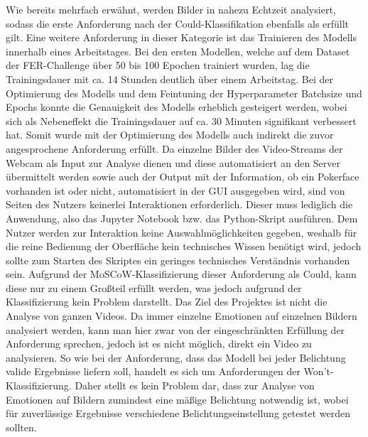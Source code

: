 \documentclass[12pt, a4paper]{report}
\begin{document}
Wie bereits mehrfach erwähnt, werden Bilder in nahezu Echtzeit analysiert, sodass die erste Anforderung nach der Could-Klassifikation ebenfalls als erfüllt gilt. Eine weitere Anforderung in dieser Kategorie ist das Trainieren des Modells innerhalb eines Arbeitstages. Bei den ersten Modellen, welche auf dem Dataset der FER-Challenge über 50 bis 100 Epochen trainiert wurden, lag die Trainingsdauer mit ca. 14 Stunden deutlich über einem Arbeitstag. Bei der Optimierung des Modells und dem Feintuning der Hyperparameter Batchsize und Epochs konnte die Genauigkeit des Modells erheblich gesteigert werden, wobei sich als Nebeneffekt die Trainingsdauer auf ca. 30 Minuten signifikant verbessert hat. Somit wurde mit der Optimierung des Modells auch indirekt die zuvor angesprochene Anforderung erfüllt. Da einzelne Bilder des Video-Streams der Webcam als Input zur Analyse dienen und diese automatisiert an den Server übermittelt werden sowie auch der Output mit der Information, ob ein Pokerface vorhanden ist oder nicht, automatisiert in der GUI ausgegeben wird, sind von Seiten des Nutzers keinerlei Interaktionen erforderlich. Dieser muss lediglich die Anwendung, also das Jupyter Notebook bzw. das Python-Skript ausführen. Dem Nutzer werden zur Interaktion keine Auswahlmöglichkeiten gegeben, weshalb für die reine Bedienung der Oberfläche kein technisches Wissen benötigt wird, jedoch sollte zum Starten des Skriptes ein geringes technisches Verständnis vorhanden sein. Aufgrund der MoSCoW-Klassifizierung dieser Anforderung als Could, kann diese nur zu einem Großteil erfüllt werden, was jedoch aufgrund der Klassifizierung kein Problem darstellt.\newline
Das Ziel des Projektes ist nicht die Analyse von ganzen Videos. Da immer einzelne Emotionen auf einzelnen Bildern analysiert werden, kann man hier zwar von der eingeschränkten Erfüllung der Anforderung sprechen, jedoch ist es nicht möglich, direkt ein Video zu analysieren. So wie bei der Anforderung, dass das Modell bei jeder Belichtung valide Ergebnisse liefern soll, handelt es sich um Anforderungen der Won't-Klassifizierung. Daher stellt es kein Problem dar, dass zur Analyse von Emotionen auf Bildern zumindest eine mäßige Belichtung notwendig ist, wobei für zuverlässige Ergebnisse verschiedene Belichtungseinstellung getestet werden sollten.

\let\cleardoublepage\relax
\end{document}
